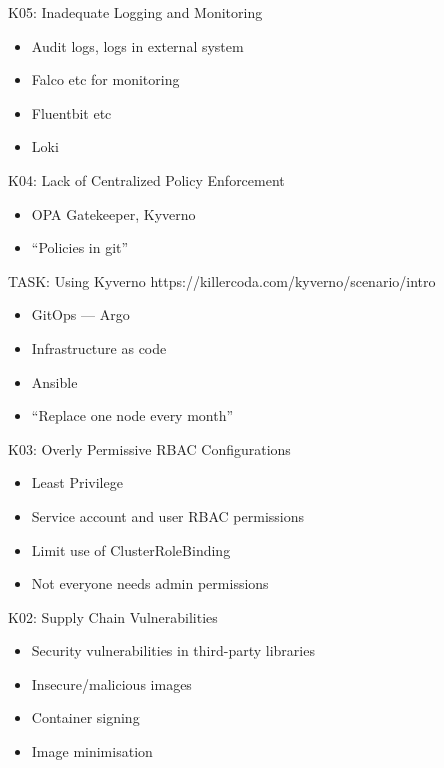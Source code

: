 \documentclass{dcpresentation}
\begin{document}

\begin{frame}{K05: Inadequate Logging and Monitoring}
  \begin{itemize}
  \item Audit logs, logs in external system
  \item Falco etc for monitoring
  \item Fluentbit etc
  \item Loki
  \end{itemize}
\end{frame}

\begin{frame}{K04: Lack of Centralized Policy Enforcement}
  \begin{itemize}
  \item OPA Gatekeeper, Kyverno
  \item ``Policies in git''
  \end{itemize}
\end{frame}

\begin{frame}{TASK: Using Kyverno}
 https://killercoda.com/kyverno/scenario/intro
\end{frame}

\begin{frame}
  \begin{itemize}
  \item GitOps --- Argo
  \item Infrastructure as code
  \item Ansible
  \item ``Replace one node every month''
  \end{itemize}
\end{frame}


\begin{frame}{K03: Overly Permissive RBAC Configurations}
  \begin{itemize}
  \item Least Privilege
  \item Service account and user RBAC permissions
  \item Limit use of ClusterRoleBinding
  \item Not everyone needs admin permissions
  \end{itemize}
\end{frame}

\begin{frame}{K02: Supply Chain Vulnerabilities}
  \begin{itemize}
  \item Security vulnerabilities in third-party libraries
  \item Insecure/malicious images
  \item Container signing
  \item Image minimisation
  \end{itemize}
\end{frame}
\end{document}
